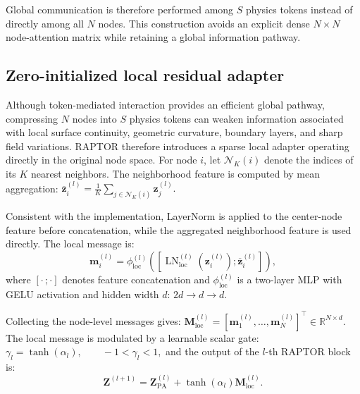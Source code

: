 \documentclass[a4paper,fleqn]{cas-sc}
\begin{document}
Global communication is therefore performed among \(S\) physics tokens instead of directly among all \(N\) nodes. This construction avoids an explicit dense \(N\times N\) node-attention matrix while retaining a global information pathway.

\subsection{Zero-initialized local residual adapter}
Although token-mediated interaction provides an efficient global pathway, compressing \(N\) nodes into \(S\) physics tokens can weaken information associated with local surface continuity, geometric curvature, boundary layers, and sharp field variations. RAPTOR therefore introduces a sparse local adapter operating directly in the original node space. For node \(i\), let \(\mathcal{N}_K(i)\) denote the indices of its \(K\) nearest neighbors. The neighborhood feature is computed by mean aggregation:  $ \overline{\mathbf{z}}_{i}^{(l)}
    =
    \frac{1}{K}
    \sum_{j\in\mathcal{N}_K(i)}
    \mathbf{z}_{j}^{(l)}.$

Consistent with the implementation, LayerNorm is applied to the center-node feature before concatenation, while the aggregated neighborhood feature is used directly. The local message is:
\begin{equation}
    \mathbf{m}_{i}^{(l)}
    =
    \phi_{\mathrm{loc}}^{(l)}
    \left(
        \left[
            \operatorname{LN}_{\mathrm{loc}}^{(l)}
            \left(
                \mathbf{z}_{i}^{(l)}
            \right);
            \overline{\mathbf{z}}_{i}^{(l)}
        \right]
    \right),
    \label{eq:local_message}
\end{equation}
where \([\cdot\,;\cdot]\) denotes feature concatenation and \(\phi_{\mathrm{loc}}^{(l)}\) is a two-layer MLP with GELU activation and hidden width \(d\): \(2d\rightarrow d\rightarrow d\).

Collecting the node-level messages gives: $ \mathbf{M}_{\mathrm{loc}}^{(l)}  =  \left[ \mathbf{m}_{1}^{(l)},\ldots,        \mathbf{m}_{N}^{(l)}  \right]^{\top}  \in\mathbb{R}^{N\times d}.$ The local message is modulated by a learnable scalar gate: $  \gamma_l=\tanh(\alpha_l),    \qquad    -1<\gamma_l<1,$ and the output of the \(l\)-th RAPTOR block is:
\begin{equation}
    \mathbf{Z}^{(l+1)}
    =
    \mathbf{Z}_{\mathrm{PA}}^{(l)}
    +
    \tanh(\alpha_l)
    \mathbf{M}_{\mathrm{loc}}^{(l)}.
    \label{eq:raptor_block}
\end{equation}
\end{document}
